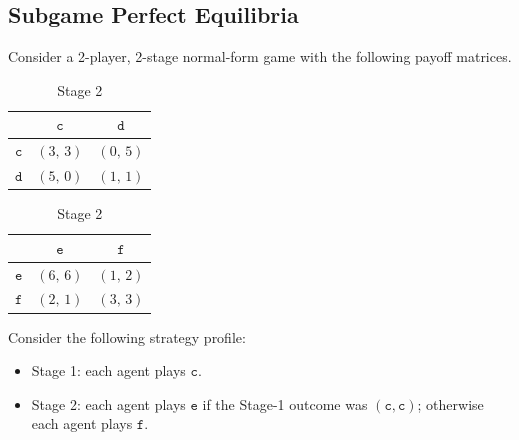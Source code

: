 \subsection{\points[12] Subgame Perfect Equilibria}
Consider a 2-player, 2-stage normal-form game with the following payoff matrices.
\begin{table}[H]
\begin{minipage}{.5\linewidth}
\centering
\begin{tabular}{|c|c|c|}
\hline
             & $\texttt{c}$       & $\texttt{d}$       \\\hline
$\texttt{c}$ & $(3,\,3)$ & $(0,\,5)$ \\\hline
$\texttt{d}$ & $(5,\,0)$ & $(1,\,1)$ \\\hline
\end{tabular}
\caption*{Stage 1}
\end{minipage}%
\begin{minipage}{.5\linewidth}
\centering
\begin{tabular}{|c|c|c|}
\hline
             & $\texttt{e}$       & $\texttt{f}$       \\\hline
$\texttt{e}$ & $(6,\,6)$ & $(1,\,2)$ \\\hline
$\texttt{f}$ & $(2,\,1)$ & $(3,\,3)$ \\\hline
\end{tabular}
\caption*{Stage 2}
\end{minipage}
\end{table}
\noindent Consider the following strategy profile:
\begin{itemize}
  \item Stage 1: each agent plays $\texttt{c}$.
  \item Stage 2: each agent plays $\texttt{e}$ if the Stage-1 outcome was
        $(\texttt{c},\texttt{c})$; otherwise each agent plays $\texttt{f}$.
\end{itemize}
